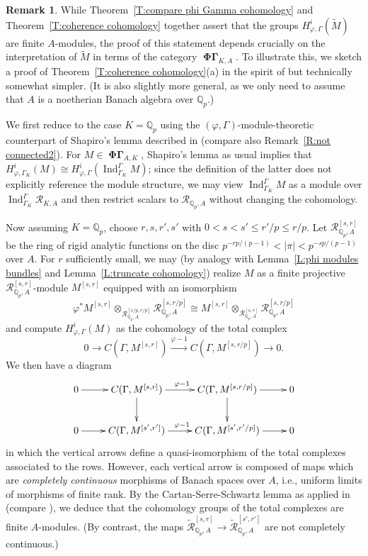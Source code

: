 \documentclass[12pt]{amsart}
\theoremstyle{definition}
\newtheorem{remark}[theorem]{Remark}
\numberwithin{equation}{theorem}
\newcommand{\QQ}{\mathbb{Q}}
\newcommand{\calR}{\mathcal{R}}
\DeclareMathOperator{\Ind}{Ind}
\DeclareMathOperator{\PhiGamma}{\mathbf{\Phi \Gamma}}
\begin{document}
\begin{remark} \label{R:Cartan-Serre}
While Theorem~\ref{T:compare phi Gamma cohomology} and Theorem~\ref{T:coherence cohomology} together assert that the groups $H^i_{\varphi, \Gamma}(\tilde{M})$
are finite $A$-modules,
the proof of this statement depends crucially on the interpretation of $\tilde{M}$ in terms of the category $\PhiGamma_{K,A}$. 
To illustrate this, we sketch a proof of Theorem~\ref{T:coherence cohomology}(a) in the spirit of \cite{kpx} but technically somewhat simpler. (It is also slightly more general,
as we only need to assume that $A$ is a noetherian Banach algebra over $\QQ_p$.)

We first reduce to the case $K = \QQ_p$ using the $(\varphi,\Gamma)$-module-theoretic counterpart of Shapiro's lemma described in \cite[Theorem~3.2]{liu-herr}
(compare also Remark~\ref{R:not connected2}).
For $M \in \PhiGamma_{A,K}$, Shapiro's lemma as usual implies that
$H^i_{\varphi,\Gamma_K}(M) \cong H^i_{\varphi,\Gamma}(\Ind^{\Gamma}_{\Gamma_K} M)$;
since the definition of the latter does not explicitly reference the module structure,
we may view $\Ind^\Gamma_{\Gamma_K} M$ as a module over
$\Ind^{\Gamma}_{\Gamma_K} \calR_{K,A}$ and then restrict scalars to $\calR_{\QQ_p,A}$
without changing the cohomology.

Now assuming $K = \QQ_p$, choose $r,s,r',s'$ with $0 < s < s' \leq r'/p \leq r/p$. 
Let $\calR^{[s,r]}_{\QQ_p,A}$ be the ring of rigid analytic functions 
on the disc $p^{-rp/(p-1)} < \left| \pi \right| < p^{-sp/(p-1)}$ over $A$. For $r$ sufficiently small, we may (by analogy with Lemma~\ref{L:phi modules bundles} and Lemma~\ref{L:truncate cohomology}) realize $M$ as a finite projective $\calR^{[s,r]}_{\QQ_p,A}$-module $M^{[s,r]}$
equipped with an isomorphism 
\[
\varphi^* M^{[s,r]} \otimes_{\calR^{[s/p,r/p]}_{\QQ_p,A}} \calR^{[s,r/p]}_{\QQ_p,A} 
\cong M^{[s,r]} \otimes_{\calR^{[s,r]}_{\QQ_p,A}} \calR^{[s,r/p]}_{\QQ_p,A}
\]
and compute $H^i_{\varphi, \Gamma}(M)$ as the cohomology of the total complex
\[
0 \to C(\Gamma, M^{[s,r]}) \stackrel{\varphi-1}{\to} C(\Gamma, M^{[s,r/p]}) \to 0.
\]
We then have a diagram
\[
\xymatrix{
0 \ar[r] & C(\Gamma, M^{[s,r]}) \ar[d] \ar^{\varphi-1}[r] & C(\Gamma, M^{[s,r/p]}) \ar[r] \ar[d] & 0 \\
0 \ar[r] & C(\Gamma, M^{[s',r']}) \ar^{\varphi-1}[r] & C(\Gamma, M^{[s',r'/p]}) \ar[r] & 0
}
\]
in which the vertical arrows define a quasi-isomorphism of the total complexes associated to the rows. However, each vertical arrow is composed of maps which are  \emph{completely continuous} morphisms of Banach spaces over $A$, i.e., uniform limits of morphisms of finite rank. 
By the Cartan-Serre-Schwartz lemma as applied in \cite[\S 3]{kedlaya-liu-finiteness}
(compare \cite[Satz~2.6]{kiehl-finiteness}),
we deduce that the cohomology groups of the total complexes are finite $A$-modules.
(By contrast, the maps $\tilde{\calR}^{[s,r]}_{\QQ_p,A} \to \tilde{\calR}^{[s',r']}_{\QQ_p,A}$ are not completely continuous.)
\end{remark}
\end{document}
